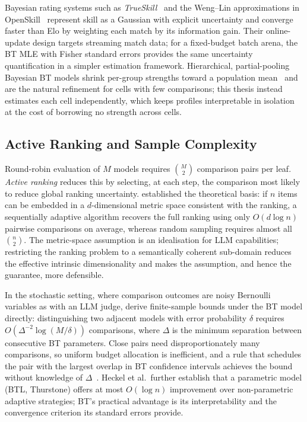 Bayesian rating systems such as
\textit{TrueSkill}~\parencite{herbrich2007trueskill} and the
Weng--Lin approximations in OpenSkill~\parencite{weng2011bayesian}
represent skill as a Gaussian with explicit uncertainty and converge
faster than Elo by weighting each match by its information gain.
Their online-update design targets streaming match data; for a
fixed-budget batch arena, the BT MLE with Fisher standard errors
provides the same uncertainty quantification in a simpler estimation
framework. Hierarchical, partial-pooling Bayesian BT models shrink
per-group strengths toward a population
mean~\parencite{cattelan2012paired} and are the natural refinement
for cells with few comparisons; this thesis instead estimates each
cell independently, which keeps profiles interpretable in isolation
at the cost of borrowing no strength across cells.

\subsection*{Active Ranking and Sample Complexity}

Round-robin evaluation of $M$ models requires $\binom{M}{2}$
comparison pairs per leaf. \textit{Active ranking} reduces this by
selecting, at each step, the comparison most likely to reduce global
ranking uncertainty. \textcite{jamieson2011activeranking} established
the theoretical basis: if $n$ items can be embedded in a
$d$-dimensional metric space consistent with the ranking, a
sequentially adaptive algorithm recovers the full ranking using only
$O(d \log n)$ pairwise comparisons on average, whereas random
sampling requires almost all $\binom{n}{2}$. The metric-space
assumption is an idealisation for LLM capabilities; restricting the
ranking problem to a semantically coherent sub-domain reduces the
effective intrinsic dimensionality and makes the assumption, and
hence the guarantee, more defensible.

In the stochastic setting, where comparison outcomes are noisy
Bernoulli variables as with an LLM judge,
\textcite{heckel2019activeranking} derive finite-sample bounds under
the BT model directly: distinguishing two adjacent models with error
probability $\delta$ requires $O(\Delta^{-2} \log(M/\delta))$
comparisons, where $\Delta$ is the minimum separation between
consecutive BT parameters. Close pairs need disproportionately many
comparisons, so uniform budget allocation is inefficient, and a rule
that schedules the pair with the largest overlap in BT confidence
intervals achieves the bound without knowledge of
$\Delta$~\parencite{heckel2019activeranking}. Heckel et al.\ further
establish that a parametric model (BTL, Thurstone) offers at most
$O(\log n)$ improvement over non-parametric adaptive strategies; BT's
practical advantage is its interpretability and the convergence
criterion its standard errors provide.

